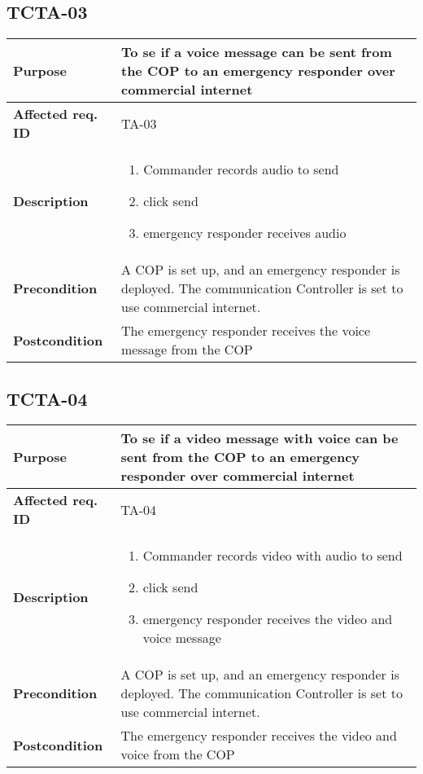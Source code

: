 \subsection{TCTA-03}
\begin{tabular}{ l | m{11cm}}
	\textbf{Purpose}			& To se if a voice message can be sent from the COP to an emergency responder over commercial internet\\ \hline
	\textbf{Affected req. ID}	& TA-03 \\ \hline
	\textbf{Description}		& \begin{enumerate}
		\item Commander records audio to send \item click send \item emergency responder receives audio
	\end{enumerate}\\
	\hline
	\textbf{Precondition}		& A COP is set up, and an emergency responder is deployed. The communication Controller is set to use commercial internet.\\ \hline
	\textbf{Postcondition}		& The emergency responder receives the voice message from the COP\\
\end{tabular}

\subsection{TCTA-04}
\begin{tabular}{ l | m{11cm}}
	\textbf{Purpose}			& To se if a video message with voice can be sent from the COP to an emergency responder over commercial internet\\ \hline
	\textbf{Affected req. ID}	& TA-04 \\ \hline
	\textbf{Description}		& \begin{enumerate}
		\item Commander records video with audio to send \item click send \item emergency responder receives the video and voice message
	\end{enumerate}\\
	\hline
	\textbf{Precondition}		& A COP is set up, and an emergency responder is deployed. The communication Controller is set to use commercial internet.\\ \hline
	\textbf{Postcondition}		& The emergency responder receives the video and voice from the COP\\
\end{tabular}

